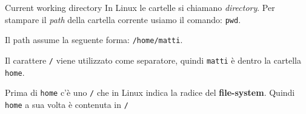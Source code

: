 \begin{frame}{Current working directory}
  In Linux le cartelle si chiamano \textit{directory}. Per stampare il 
  \textit{path} della cartella corrente usiamo il comando: \texttt{pwd}.\bigskip

  Il path assume la seguente forma: \texttt{/home/matti}.\bigskip

  Il carattere \texttt{/} viene utilizzato come separatore, quindi \texttt{matti}
  è dentro la cartella \texttt{home}. \bigskip 

  Prima di \texttt{home} c'è uno \texttt{/}
  che in Linux indica la radice del \textbf{file-system}. Quindi \texttt{home} a sua
  volta è contenuta in \texttt{/}
\end{frame}